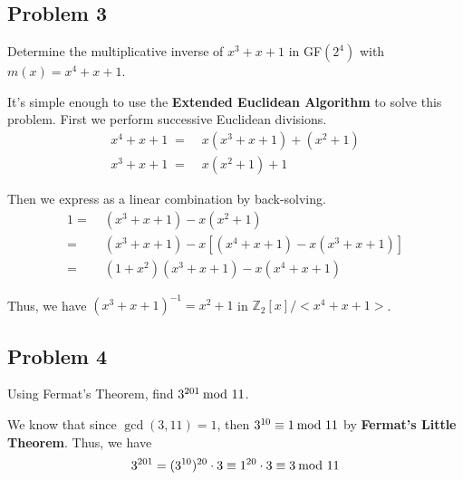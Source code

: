 \documentclass[../hw_sols.tex]{subfiles}
\begin{document}
\subsection*{Problem 3}

Determine the multiplicative inverse of $x^3 + x + 1$ in GF$(2^4)$ with 
$m(x) = x^4 + x + 1$.

\begin{solution}

It's simple enough to use the \textbf{Extended Euclidean Algorithm} to solve 
this problem. First we perform successive Euclidean divisions.
\begin{align*}
	x^4 + x + 1 \; =& \; x(x^3 + x + 1) + (x^2 + 1) \\
	x^3 + x + 1 \; =& \; x(x^2+ 1) + 1
\end{align*}

Then we express as a linear combination by back-solving.
\begin{align*}
	1 =& \; (x^3 + x + 1) - x(x^2 + 1) \\
	=& \; (x^3 + x + 1) - x[(x^4 + x+ 1) - x(x^3 + x + 1)] \\
	=& \; (1 + x^2)(x^3 + x + 1) - x(x^4 + x + 1)
\end{align*}

\noindent Thus, we have $(x^3+x+1)^{-1} = x^2 + 1$ in 
$\mathbb{Z}_2[x]/<x^4+x+1>$.

\end{solution}



\subsection*{Problem 4}

Using Fermat's Theorem, find $3^{201} \tmod{11}$.

\begin{solution}
We know that since $\gcd(3,11) = 1$, then $3^{10} \equiv 1 \tmod{11}$ by 
\textbf{Fermat's Little Theorem}. Thus, we have 
	\[ 3^{201} 
	= (3^{10})^{20} \cdot 3 
	\equiv 1^{20} \cdot 3 
	\equiv 3 \tmod{11} \]
\end{solution}


\end{document}
